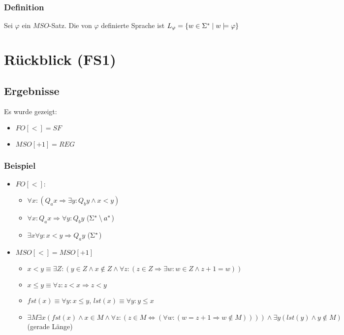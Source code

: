         \subsubsection{Definition}
            Sei $\varphi$ ein $MSO$-Satz. Die von $\varphi$ definierte Sprache ist $L_\varphi=\{w\in\Sigma^*\mid w\models\varphi\}$
    \section{Rückblick (FS1)}
        \subsection{Ergebnisse}
            Es wurde gezeigt: \begin{itemize}
                \item $FO[<]=SF$
                \item $MSO[+1]=REG$
            \end{itemize}
        \subsubsection{Beispiel}
            \begin{itemize}
                \item $FO[<]:$
                \begin{itemize}
                    \item $\forall x:\left(Q_ax\Rightarrow\exists y:Q_by\wedge x<y\right)$
                    \item $\forall x:Q_ax\Rightarrow\forall y:Q_by$ ($\Sigma^*\setminus a^*$)
                    \item $\exists x\forall y:x<y\Rightarrow Q_ay$ ($\Sigma^*$)
                \end{itemize}
                \item $MSO[<]=MSO[+1]$
                \begin{itemize}
                    \item $x<y\equiv \exists Z:(y\in Z\wedge x\not\in Z\wedge \forall z:(z\in Z\Rightarrow\exists w:w\in Z\wedge z+1=w))$
                    \item $x\le y\equiv \forall z: z< x\Rightarrow z< y$
                    \item $fst(x)\equiv \forall y: x\le y$, $lst(x)\equiv \forall y: y\le x$
                    \item $\exists M\exists x\left(fst(x)\wedge x\in M\wedge\forall z:\left(z\in M\Leftrightarrow\left(\forall w:(w=z+1\Rightarrow w\not\in M)\right)\right)\right)\wedge \exists y(lst(y)\wedge y\not\in M)$ (gerade Länge)
                \end{itemize}
            \end{itemize}
